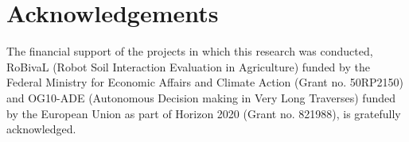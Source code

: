 \section*{Acknowledgements}
The financial support of the projects in which this research was conducted, RoBivaL (Robot Soil Interaction Evaluation in Agriculture) funded by the Federal Ministry for Economic Affairs and Climate Action (Grant no. 50RP2150) and OG10-ADE (Autonomous Decision making in Very Long Traverses) funded by the European Union as part of Horizon 2020 (Grant no. 821988), is gratefully acknowledged.